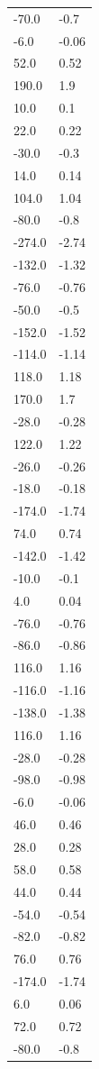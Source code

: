 \begin{longtable}{ll}
-70.0 & -0.7 \\
-6.0 & -0.06 \\
52.0 & 0.52 \\
190.0 & 1.9 \\
10.0 & 0.1 \\
22.0 & 0.22 \\
-30.0 & -0.3 \\
14.0 & 0.14 \\
104.0 & 1.04 \\
-80.0 & -0.8 \\
-274.0 & -2.74 \\
-132.0 & -1.32 \\
-76.0 & -0.76 \\
-50.0 & -0.5 \\
-152.0 & -1.52 \\
-114.0 & -1.14 \\
118.0 & 1.18 \\
170.0 & 1.7 \\
-28.0 & -0.28 \\
122.0 & 1.22 \\
-26.0 & -0.26 \\
-18.0 & -0.18 \\
-174.0 & -1.74 \\
74.0 & 0.74 \\
-142.0 & -1.42 \\
-10.0 & -0.1 \\
4.0 & 0.04 \\
-76.0 & -0.76 \\
-86.0 & -0.86 \\
116.0 & 1.16 \\
-116.0 & -1.16 \\
-138.0 & -1.38 \\
116.0 & 1.16 \\
-28.0 & -0.28 \\
-98.0 & -0.98 \\
-6.0 & -0.06 \\
46.0 & 0.46 \\
28.0 & 0.28 \\
58.0 & 0.58 \\
44.0 & 0.44 \\
-54.0 & -0.54 \\
-82.0 & -0.82 \\
76.0 & 0.76 \\
-174.0 & -1.74 \\
6.0 & 0.06 \\
72.0 & 0.72 \\
-80.0 & -0.8 \\

\end{longtable}
